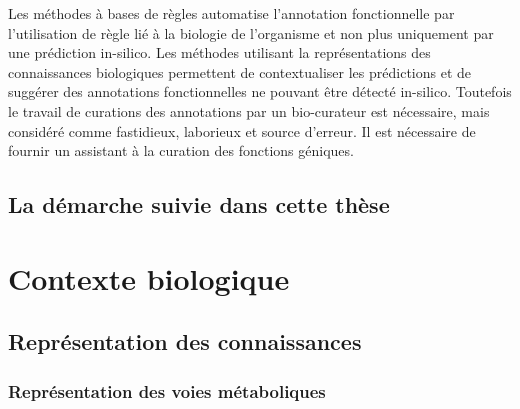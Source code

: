 Les méthodes à bases de règles automatise l'annotation fonctionnelle par l'utilisation de règle lié à la biologie de l'organisme et non plus uniquement par une prédiction in-silico.  Les méthodes utilisant la représentations des connaissances biologiques permettent de contextualiser les prédictions et de suggérer des annotations fonctionnelles ne pouvant être détecté in-silico. Toutefois le travail de curations des annotations par un bio-curateur est nécessaire, mais considéré comme fastidieux, laborieux et source d'erreur. Il est nécessaire de fournir un assistant à la curation des fonctions géniques.




\section*{La démarche suivie dans cette thèse}

\chapter{Contexte biologique}

\section{Représentation des connaissances}
\subsection{Représentation des voies métaboliques}
